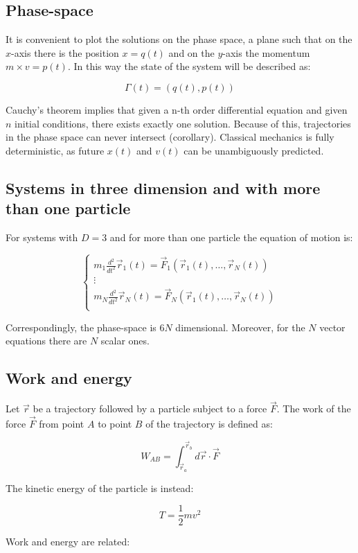   \subsection{Phase-space}
  It is convenient to plot the solutions on the phase space, a plane such that on the $x$-axis there is the position $x=q(t)$ and on the $y$-axis the momentum $m\times v=p(t)$.
  In this way the state of the system will be described as:

  $$\Gamma(t) = (q(t),p(t))$$

  Cauchy's theorem implies that given a n-th order differential equation and given $n$ initial conditions, there exists exactly one solution.
  Because of this, trajectories in the phase space can never intersect (corollary).
  Classical mechanics is fully deterministic, as future $x(t)$ and $v(t)$ can be unambiguously predicted. 

  \subsection{Systems in three dimension and with more than one particle}
  For systems with $D=3$ and for more than one particle the equation of motion is:

  $$\begin{cases}
    m_1 \frac{d{^2}}{d{t^2}}\vec{r}_1(t) = \vec{F}_1(\vec{r}_1(t), \dots,\vec{r}_N(t))\\
    \vdots\\
    m_N \frac{d{^2}}{d{t^2}}\vec{r}_N(t) = \vec{F}_N(\vec{r}_1(t), \dots,\vec{r}_N(t))\\
  \end{cases}$$

  Correspondingly, the phase-space is $6N$ dimensional.
  Moreover, for the $N$ vector equations there are $N$ scalar ones.

  \subsection{Work and energy}
  Let $\vec{r}$ be a trajectory followed by a particle subject to a force $\vec{F}$.
  The work of the force $\vec{F}$ from point $A$ to point $B$ of the trajectory is defined as:

  $$W_{AB} = \int_{\vec{r}_a}^{\vec{r}_b}d \vec{r}\cdot \vec{F}$$

  The kinetic energy of the particle is instead:

  $$T = \frac{1}{2}mv^2$$

  Work and energy are related:

